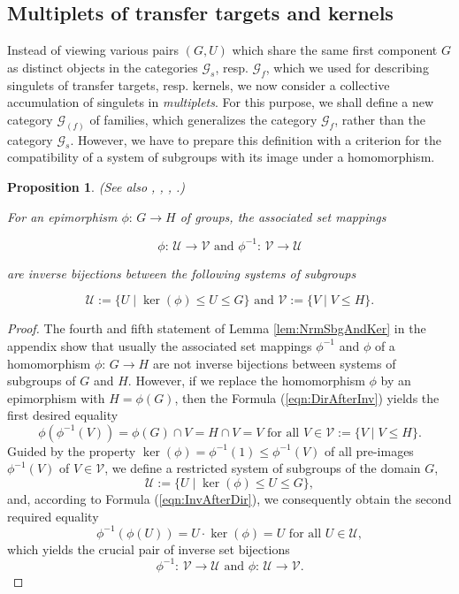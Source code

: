 \documentclass{amsart}
\newtheorem{proposition}{Proposition}[section]
\theoremstyle{definition}
\numberwithin{equation}{section}
\begin{document}
\subsection{Multiplets of transfer targets and kernels}
\label{ss:KernelTargetMult}

Instead of viewing various pairs \((G,U)\) which share the same first component \(G\)
as distinct objects in the categories \(\mathcal{G}_s\), resp. \(\mathcal{G}_f\),
which we used for describing singulets of transfer targets, resp. kernels,
we now consider a collective accumulation of singulets in \textit{multiplets}.
For this purpose, we shall define a new category \(\mathcal{G}_{(f)}\) of families,
which generalizes the category \(\mathcal{G}_f\), rather than the category \(\mathcal{G}_s\).
However, we have to prepare this definition with a criterion for the
compatibility of a system of subgroups with its image under a homomorphism.


\begin{proposition}
\label{prp:InvSetBij}
(See also
\cite[Thm.2.3.4, p.29]{Hl},
\cite[Satz 3.10, p.16]{Hp},
\cite[Thm.2.4, p.6]{Gs},
\cite[Thm.X.21, p.340]{Is}.)

For an epimorphism \(\phi:\, G\to H\) of groups,
the associated set mappings

\begin{equation}
\label{eqn:InvSetBij}
\phi:\,\mathcal{U}\to\mathcal{V} \text{ and } \phi^{-1}:\,\mathcal{V}\to\mathcal{U}
\end{equation}

\noindent
are inverse bijections between the following systems of subgroups

\begin{equation}
\label{eqn:RstSysSbg}
\mathcal{U}:=\lbrace U\mid\ker(\phi)\le U\le G\rbrace \text{ and } \mathcal{V}:=\lbrace V\mid V\le H\rbrace.
\end{equation}

\end{proposition}


\begin{proof}
The fourth and fifth statement of Lemma
\ref{lem:NrmSbgAndKer}
in the appendix
show that usually the associated set mappings \(\phi^{-1}\) and \(\phi\)
of a homomorphism \(\phi:\,G\to H\)
are not inverse bijections between systems of subgroups of \(G\) and \(H\).
However, if we replace the homomorphism \(\phi\) by an epimorphism with \(H=\phi(G)\),
then the Formula
(\ref{eqn:DirAfterInv})
yields the first desired equality
\[\phi(\phi^{-1}(V))=\phi(G)\cap V=H\cap V=V \text{ for all } V\in\mathcal{V}:=\lbrace V\mid V\le H\rbrace.\]
Guided by the property \(\ker(\phi)=\phi^{-1}(1)\le\phi^{-1}(V)\)
of all pre-images \(\phi^{-1}(V)\) of \(V\in\mathcal{V}\),
we define a restricted system of subgroups of the domain \(G\),
\[\mathcal{U}:=\lbrace U\mid\ker(\phi)\le U\le G\rbrace,\]
and, according to Formula
(\ref{eqn:InvAfterDir}),
we consequently obtain the second required equality
\[\phi^{-1}(\phi(U))=U\cdot\ker(\phi)=U \text{ for all } U\in\mathcal{U},\]
which yields the crucial pair of inverse set bijections
\[\phi^{-1}:\,\mathcal{V}\to\mathcal{U} \text{ and } \phi:\,\mathcal{U}\to\mathcal{V}.\]
\end{proof}
\end{document}
